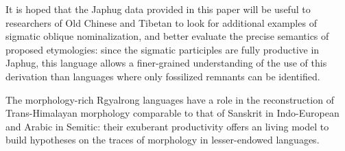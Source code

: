 \documentclass[oneside,a4paper,11pt]{article}
\begin{document}
It is hoped that the Japhug data provided in this paper will be useful to researchers of Old Chinese and Tibetan to look for additional examples of sigmatic oblique nominalization, and better evaluate the precise semantics of proposed etymologies: since the sigmatic participles are fully productive in Japhug, this language allows a finer-grained understanding of the use of this derivation than languages where only fossilized remnants can be identified. 

The morphology-rich Rgyalrong languages have a role in the reconstruction of Trans-Himalayan morphology comparable to that of Sanskrit in Indo-European and Arabic in Semitic: their exuberant productivity offers an living model to build hypotheses on the traces of morphology in lesser-endowed languages.



\end{document}

